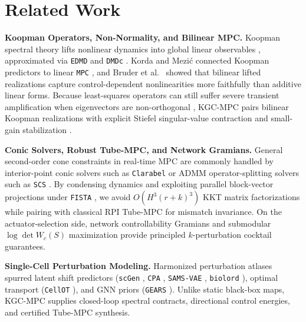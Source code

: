 \documentclass[journal]{IEEEtran}
\begin{document}
\section{Related Work}

\textbf{Koopman Operators, Non-Normality, and Bilinear MPC.} Koopman spectral theory lifts nonlinear dynamics into global linear observables \cite{koopman1931hamiltonian,mezic2013analysis,brunton2022modern}, approximated via \texttt{EDMD} \cite{williams2015edmd} and \texttt{DMDc} \cite{proctor2016dmdc}. Korda and Mezi{\'c} \cite{korda2018linear} connected Koopman predictors to linear \texttt{MPC} \cite{mayne2000constrained}, and Bruder et al.\ \cite{bruder2021tro,bruder2021ral} showed that bilinear lifted realizations capture control-dependent nonlinearities more faithfully than additive linear forms. Because least-squares operators can still suffer severe transient amplification when eigenvectors are non-orthogonal \cite{trefethen2005spectra}, KGC-MPC pairs bilinear Koopman realizations with explicit Stiefel singular-value contraction \cite{edelman1998geometry} and small-gain stabilization \cite{boyd1994lmi}.

\textbf{Conic Solvers, Robust Tube-MPC, and Network Gramians.} General second-order cone constraints in real-time MPC are commonly handled by interior-point conic solvers such as \texttt{Clarabel} \cite{goulart2024clarabel} or ADMM operator-splitting solvers such as \texttt{SCS} \cite{odonoghue2016conic}. By condensing dynamics and exploiting parallel block-vector projections under \texttt{FISTA} \cite{beck2009fista}, we avoid $O(H^3(r+k)^3)$ KKT matrix factorizations while pairing with classical RPI Tube-MPC \cite{mayne2005robust,rawlings2017model} for mismatch invariance. On the actuator-selection side, network controllability Gramians \cite{kalman1963controllability,liu2011controllability,yan2015spectrum,pasqualetti2014controllability} and submodular $\log\det W_c(S)$ maximization \cite{summers2016submodularity,nemhauser1978analysis} provide principled $k$-perturbation cocktail guarantees.

\textbf{Single-Cell Perturbation Modeling.} Harmonized perturbation atlases \cite{norman2019exploring,adamson2016multiplexed,srivatsan2020massively,peidli2024scperturb} spurred latent shift predictors (\texttt{scGen} \cite{lotfollahi2019scgen}, \texttt{CPA} \cite{lotfollahi2023cpa}, \texttt{SAMS-\allowbreak VAE} \cite{bereket2023samsvae}, \texttt{biolord} \cite{piran2024biolord}), optimal transport (\texttt{CellOT} \cite{bunne2023cellot}), and GNN priors (\texttt{GEARS} \cite{roohani2024gears}). Unlike static black-box maps, KGC-MPC supplies closed-loop spectral contracts, directional control energies, and certified Tube-MPC synthesis.
\end{document}
